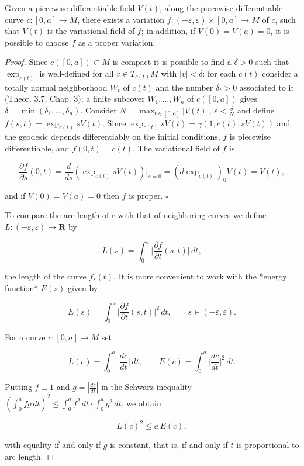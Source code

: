 \begin{proposition}
  \label{prop:dc-ch9-2-2}
  Given a piecewise differentiable field $V(t)$, along the piecewise differentiable
  curve $c:[0,a]\to M$, there exists a variation $f:(-\varepsilon,\varepsilon)\times[0,a]\to M$
  of $c$, such that $V(t)$ is the variational field of $f$; in addition, if
  $V(0)=V(a)=0$, it is possible to choose $f$ as a proper variation.
\end{proposition}
\begin{proof}
  Since $c([0,a])\subset M$ is compact it is possible to find a $\delta>0$
  such that $\exp_{c(t)}$ is well-defined for all $v\in T_{c(t)}M$ with $|v|<\delta$:
  for each $c(t)$ consider a totally normal neighborhood $W_t$ of $c(t)$ and the
  number $\delta_t>0$ associated to it (Theor. 3.7, Chap. 3); a finite subcover
  $W_1,\dots,W_n$ of $c([0,a])$ gives $\delta=\min(\delta_1,\dots,\delta_n)$.
  Consider $N=\max_{t\in[0,a]}|V(t)|$, $\varepsilon<\frac{\delta}{N}$ and define
  $f(s,t)=\exp_{c(t)}sV(t)$. Since $\exp_{c(t)}sV(t)=\gamma(1,c(t),sV(t))$ and the
  geodesic depends differentiably on the initial conditions, $f$ is piecewise
  differentiable, and $f(0,t)=c(t)$. The variational field of $f$ is
  
  $$
  \frac{\partial f}{\partial s}(0,t)=\frac{d}{ds}(\exp_{c(t)}sV(t))\Big|_{s=0}=(d\exp_{c(t)})_0 V(t)=V(t),
  $$
  
  and if $V(0)=V(a)=0$ then $f$ is proper. $\square$
  
  To compare the arc length of $c$ with that of neighboring curves we define
  $L:(-\varepsilon,\varepsilon)\to\mathbf{R}$ by
  
  $$
  L(s)=\int_0^a\Big|\frac{\partial f}{\partial t}(s,t)\Big|\,dt,
  $$
  
  the length of the curve $f_s(t)$. It is more convenient to work with the *energy
  function* $E(s)$ given by
  
  $$
  E(s)=\int_0^a\Big|\frac{\partial f}{\partial t}(s,t)\Big|^2\,dt,\qquad s\in(-\varepsilon,\varepsilon).
  $$
  
  For a curve $c:[0,a]\to M$ set
  
  $$
  L(c)=\int_0^a\Big|\frac{dc}{dt}\Big|\,dt,\qquad E(c)=\int_0^a\Big|\frac{dc}{dt}\Big|^2\,dt.
  $$
  
  Putting $f\equiv 1$ and $g=|\frac{dc}{dt}|$ in the Schwarz inequality
  $(\int_0^a fg\,dt)^2\le\int_0^a f^2\,dt\cdot\int_0^a g^2\,dt$, we obtain
  
  $$
  L(c)^2\le a\,E(c),
  $$
  
  with equality if and only if $g$ is constant, that is, if and only if $t$ is
  proportional to arc length.
\end{proof}

